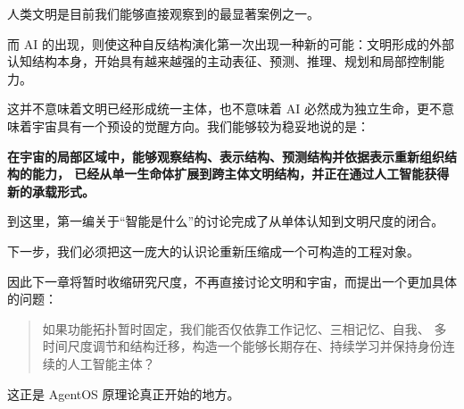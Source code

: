 人类文明是目前我们能够直接观察到的最显著案例之一。

而 AI 的出现，则使这种自反结构演化第一次出现一种新的可能：文明形成的外部认知结构本身，开始具有越来越强的主动表征、预测、推理、规划和局部控制能力。

这并不意味着文明已经形成统一主体，也不意味着 AI 必然成为独立生命，更不意味着宇宙具有一个预设的觉醒方向。我们能够较为稳妥地说的是：

\begin{statementbox}
\bfseries
在宇宙的局部区域中，能够观察结构、表示结构、预测结构并依据表示重新组织结构的能力，
已经从单一生命体扩展到跨主体文明结构，并正在通过人工智能获得新的承载形式。
\end{statementbox}

到这里，第一编关于“智能是什么”的讨论完成了从单体认知到文明尺度的闭合。

下一步，我们必须把这一庞大的认识论重新压缩成一个可构造的工程对象。

因此下一章将暂时收缩研究尺度，不再直接讨论文明和宇宙，而提出一个更加具体的问题：

\begin{quote}
如果功能拓扑暂时固定，我们能否仅依靠工作记忆、三相记忆、自我、
多时间尺度调节和结构迁移，构造一个能够长期存在、持续学习并保持身份连续的人工智能主体？
\end{quote}

这正是 AgentOS 原理论真正开始的地方。
